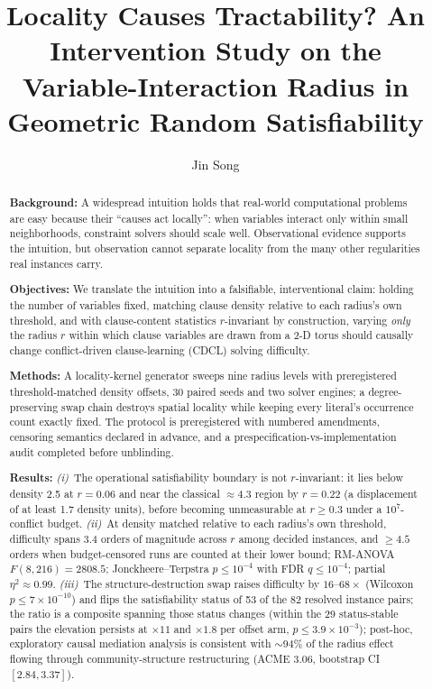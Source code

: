 \documentclass[manuscript, screen, review]{jair}
\begin{document}
\title[Locality Causes Tractability?]{Locality Causes Tractability? An
Intervention Study on the Variable-Interaction Radius in Geometric Random
Satisfiability}

\author{Jin Song}

\renewcommand{\shortauthors}{Song}

\begin{abstract}
{\bf Background:} A widespread intuition holds that real-world computational
problems are easy because their ``causes act locally'': when variables
interact only within small neighborhoods, constraint solvers should scale
well. Observational evidence supports the intuition, but observation cannot
separate locality from the many other regularities real instances carry.

{\bf Objectives:} We translate the intuition into a falsifiable, interventional
claim: holding the number of variables fixed, matching clause density relative
to each radius's own threshold, and with clause-content statistics
$r$-invariant by construction, varying \emph{only} the radius $r$ within which
clause variables are drawn from a 2-D torus should causally change
conflict-driven clause-learning (CDCL) solving difficulty.

{\bf Methods:} A locality-kernel generator sweeps nine radius levels with
preregistered threshold-matched density offsets, 30 paired seeds and two
solver engines; a degree-preserving swap chain destroys spatial locality while
keeping every literal's occurrence count exactly fixed. The protocol is
preregistered with numbered amendments, censoring semantics declared in
advance, and a prespecification-vs-implementation audit completed before
unblinding.

{\bf Results:} \emph{(i)}~The operational satisfiability boundary is not
$r$-invariant: it lies below density 2.5 at $r=0.06$ and near the classical
${\approx}4.3$ region by $r=0.22$ (a displacement of at least 1.7 density
units), before becoming unmeasurable at $r\ge 0.3$ under a
$10^7$-conflict budget. \emph{(ii)}~At density matched relative to each
radius's own threshold, difficulty spans $3.4$ orders of magnitude across $r$
among decided instances, and $\ge 4.5$ orders when budget-censored runs are
counted at their lower bound; RM-ANOVA $F(8,216)=2808.5$; Jonckheere--Terpstra
$p\le 10^{-4}$ with FDR $q\le 10^{-4}$; partial $\eta^2 \approx 0.99$.
\emph{(iii)}~The structure-destruction swap raises difficulty by
$16$--$68\times$ (Wilcoxon $p\le 7\times10^{-10}$) and flips the
satisfiability status of 53 of the 82 resolved instance pairs; the ratio
is a composite spanning those status changes (within the 29 status-stable
pairs the
elevation persists at $\times 11$ and $\times 1.8$ per offset arm,
$p\le 3.9\times10^{-3}$); post-hoc, exploratory causal
mediation analysis is consistent with ${\sim}94\%$ of the radius effect flowing
through community-structure restructuring (ACME
3.06, bootstrap CI $[2.84, 3.37]$).


\end{abstract}
\end{document}
